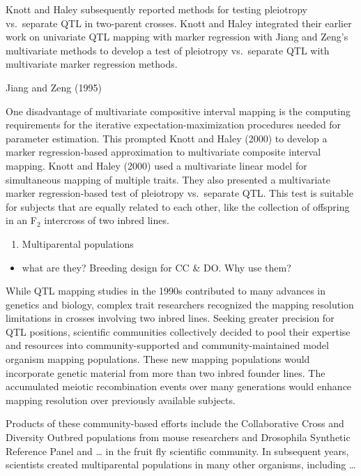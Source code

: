 \documentclass[]{article}
\providecommand{\tightlist}{%
  \setlength{\itemsep}{0pt}\setlength{\parskip}{0pt}}
\begin{document}
Knott and Haley subsequently reported methods for testing pleiotropy
vs.~separate QTL in two-parent crosses. Knott and Haley integrated their
earlier work on univariate QTL mapping with marker regression with Jiang
and Zeng's multivariate methods to develop a test of pleiotropy
vs.~separate QTL with multivariate marker regression methods.

Jiang and Zeng (1995)

One disadvantage of multivariate compositive interval mapping is the
computing requirements for the iterative expectation-maximization
procedures needed for parameter estimation. This prompted Knott and
Haley (2000) to develop a marker regression-based approximation to
multivariate composite interval mapping. Knott and Haley (2000) used a
multivariate linear model for simultaneous mapping of multiple traits.
They also presented a multivariate marker regression-based test of
pleiotropy vs.~separate QTL. This test is suitable for subjects that are
equally related to each other, like the collection of offspring in an
F\(_2\) intercross of two inbred lines.

\begin{enumerate}
\def\labelenumi{\arabic{enumi}.}
\setcounter{enumi}{3}
\tightlist
\item
  Multiparental populations
\end{enumerate}

\begin{itemize}
\tightlist
\item
  what are they? Breeding design for CC \& DO. Why use them?
\end{itemize}

While QTL mapping studies in the 1990s contributed to many advances in
genetics and biology, complex trait researchers recognized the mapping
resolution limitations in crosses involving two inbred lines. Seeking
greater precision for QTL positions, scientific communities collectively
decided to pool their expertise and resources into community-supported
and community-maintained model organism mapping populations. These new
mapping populations would incorporate genetic material from more than
two inbred founder lines. The accumulated meiotic recombination events
over many generations would enhance mapping resolution over previously
available subjects.

Products of these community-based efforts include the Collaborative
Cross and Diversity Outbred populations from mouse researchers and
Drosophila Synthetic Reference Panel and \ldots{} in the fruit fly
scientific community. In subsequent years, scientists created
multiparental populations in many other organisms, including \ldots{}
\end{document}
